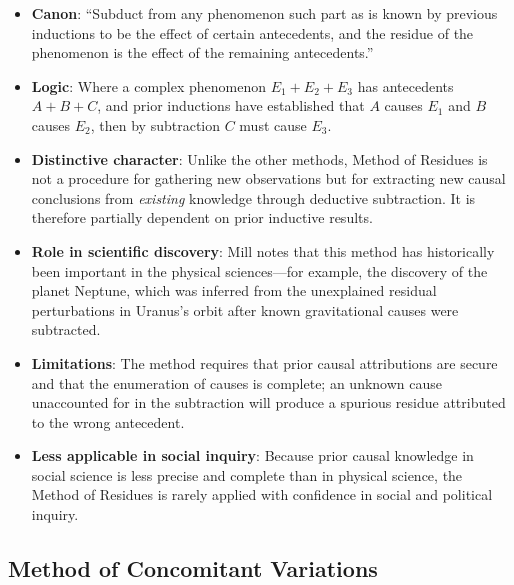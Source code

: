 \documentclass[12pt]{article}
\begin{document}
\begin{itemize}[leftmargin=*, itemsep=4pt]
    \item \textbf{Canon}: ``Subduct from any phenomenon such part as is known by previous inductions to be the effect of certain antecedents, and the residue of the phenomenon is the effect of the remaining antecedents.''
    \item \textbf{Logic}: Where a complex phenomenon $E_1 + E_2 + E_3$ has antecedents $A + B + C$, and prior inductions have established that $A$ causes $E_1$ and $B$ causes $E_2$, then by subtraction $C$ must cause $E_3$.
    \item \textbf{Distinctive character}: Unlike the other methods, Method of Residues is not a procedure for gathering new observations but for extracting new causal conclusions from \emph{existing} knowledge through deductive subtraction. It is therefore partially dependent on prior inductive results.
    \item \textbf{Role in scientific discovery}: Mill notes that this method has historically been important in the physical sciences---for example, the discovery of the planet Neptune, which was inferred from the unexplained residual perturbations in Uranus's orbit after known gravitational causes were subtracted.
    \item \textbf{Limitations}: The method requires that prior causal attributions are secure and that the enumeration of causes is complete; an unknown cause unaccounted for in the subtraction will produce a spurious residue attributed to the wrong antecedent.
    \item \textbf{Less applicable in social inquiry}: Because prior causal knowledge in social science is less precise and complete than in physical science, the Method of Residues is rarely applied with confidence in social and political inquiry.
\end{itemize}

\subsection{Method of Concomitant Variations}
\end{document}

